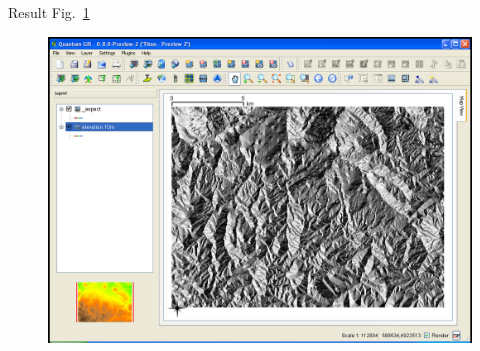 Result Fig.~\ref{fig:qgis044}

\begin{figure}[htbp]
   \centering
   \includegraphics[scale=0.2]{qgis044.png}
   \caption{}
   \label{fig:qgis044}
\end{figure}

\address{GRASS Development Team\\
  \url{http://grass.itc.it}\\
  }


